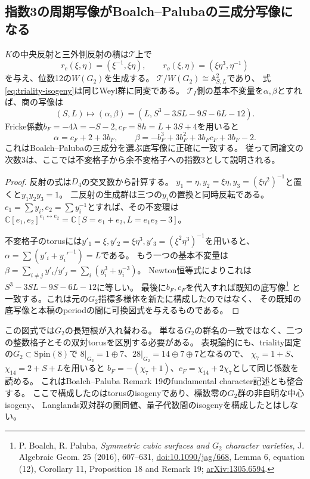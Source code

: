 \subsection{指数3の周期写像がBoalch--Palubaの三成分写像になる}
\begin{theorem}[二つのWeyl商の間の可換図式]
\label{thm:G2-period-isogeny-quotient}
$K$の中央反射と三外側反射の積は$\mathcal T$上で
\[
 r_c(\xi,\eta)=(\xi^{-1},\xi\eta),\qquad
 r_o(\xi,\eta)=(\xi\eta^3,\eta^{-1})
\]
を与え、位数12の$W(G_2)$を生成する。
$\mathcal T/W(G_2)\cong\mathbb A^2_{S,L}$であり、
式\eqref{eq:triality-isogeny}は同じWeyl群に同変である。
$\mathcal T_I$側の基本不変量を$\alpha,\beta$とすれば、商の写像は
\begin{equation}\label{eq:period-isogeny-on-quotients}
 (S,L)\longmapsto
 (\alpha,\beta)=(L,S^3-3SL-9S-6L-12).
\end{equation}
Fricke係数$b_F=-4\lambda=-S-2,c_F=8h=L+3S+4$を用いると
\[
 \alpha=c_F+2+3b_F,\qquad
 \beta=-b_F^3+3b_F^2+3b_Fc_F+3b_F-2.
\]
これはBoalch--Palubaの三成分を選ぶ底写像に正確に一致する。
従って同論文の次数3は、ここでは不変格子から余不変格子への指数3として説明される。
\end{theorem}
\begin{proof}
反射の式は$D_4$の交叉数から計算する。
$y_1=\eta,y_2=\xi\eta,y_3=(\xi\eta^2)^{-1}$と置くと$y_1y_2y_3=1$。
二反射の生成群は三つの$y_i$の置換と同時反転である。
$e_1=\sum y_i,e_2=\sum y_i^{-1}$とすれば、その不変環は
$\mathbb C[e_1,e_2]^{e_1\leftrightarrow e_2}
=\mathbb C[S=e_1+e_2,L=e_1e_2-3]$。

不変格子のtorusには$y'_1=\xi,y'_2=\xi\eta^3,
 y'_3=(\xi^2\eta^3)^{-1}$を用いると、
$\alpha=\sum(y'_i+y_i'^{-1})=L$である。
もう一つの基本不変量は
$\beta=\sum_{i\ne j}y'_i/y'_j=\sum_i(y_i^3+y_i^{-3})$。
Newton恒等式によりこれは$S^3-3SL-9S-6L-12$に等しい。
最後に$b_F,c_F$を代入すれば既知の底写像\footnote{
P. Boalch, R. Paluba, \emph{Symmetric cubic surfaces and $G_2$ character varieties},
J. Algebraic Geom. 25 (2016), 607--631,
\href{https://doi.org/10.1090/jag/668}{doi:10.1090/jag/668},
Lemma 6, equation (12), Corollary 11, Proposition 18 and Remark 19;
\href{https://arxiv.org/abs/1305.6594}{arXiv:1305.6594}.}
と一致する。これは元の$G_2$指標多様体を新たに構成したのではなく、
その既知の底写像と本稿のperiodの間に可換図式を与えるものである。
\end{proof}

この図式では$G_2$の長短根が入れ替わる。
単なる$G_2$の群名の一致ではなく、二つの整数格子とその双対torusを区別する必要がある。
表現論的にも、triality固定の$G_2\subset\mathrm{Spin}(8)$で
$8|_{G_2}=1\oplus7$、$28|_{G_2}=14\oplus7\oplus7$となるので、
$\chi_7=1+S$、$\chi_{14}=2+S+L$を用いると
$b_F=-(\chi_7+1)$、$c_F=\chi_{14}+2\chi_7$として同じ係数を読める。
これはBoalch--Paluba Remark 19のfundamental character記述とも整合する。
ここで構成したのはtorusのisogenyであり、標数零の$G_2$群の非自明な中心isogeny、
Langlands双対群の圏同値、量子代数間のisogenyを構成したとはしない。

